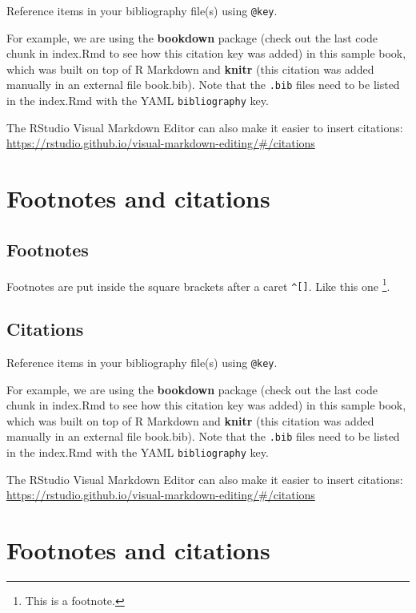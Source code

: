 \documentclass[
]{book}
\begin{document}
Reference items in your bibliography file(s) using \texttt{@key}.

For example, we are using the \textbf{bookdown} package (check out the last code chunk in index.Rmd to see how this citation key was added) in this sample book, which was built on top of R Markdown and \textbf{knitr} \citep{xie2015} (this citation was added manually in an external file book.bib).
Note that the \texttt{.bib} files need to be listed in the index.Rmd with the YAML \texttt{bibliography} key.

The RStudio Visual Markdown Editor can also make it easier to insert citations: \url{https://rstudio.github.io/visual-markdown-editing/\#/citations}

\hypertarget{footnotes-and-citations-2}{%
\chapter{Footnotes and citations}\label{footnotes-and-citations-2}}

\hypertarget{footnotes-2}{%
\section{Footnotes}\label{footnotes-2}}

Footnotes are put inside the square brackets after a caret \texttt{\^{}{[}{]}}. Like this one \footnote{This is a footnote.}.

\hypertarget{citations-2}{%
\section{Citations}\label{citations-2}}

Reference items in your bibliography file(s) using \texttt{@key}.

For example, we are using the \textbf{bookdown} package (check out the last code chunk in index.Rmd to see how this citation key was added) in this sample book, which was built on top of R Markdown and \textbf{knitr} \citep{xie2015} (this citation was added manually in an external file book.bib).
Note that the \texttt{.bib} files need to be listed in the index.Rmd with the YAML \texttt{bibliography} key.

The RStudio Visual Markdown Editor can also make it easier to insert citations: \url{https://rstudio.github.io/visual-markdown-editing/\#/citations}

\hypertarget{footnotes-and-citations-3}{%
\chapter{Footnotes and citations}\label{footnotes-and-citations-3}}
\end{document}
